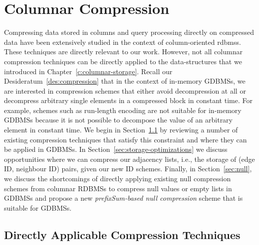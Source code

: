 \chapter{Columnar Compression}
\label{columnar-compression}

Compressing data stored in columns and query processing directly on compressed data have been extensively studied in the context of column-oriented \gls{rdbms}s. These techniques are directly relevant to our work. However, not all columnar compression techniques can be directly applied to the data-structures that we introduced in Chapter~\ref{c:columnar-storage}. Recall our Desideratum~\ref{des:compression} that in the context of in-memory GDBMSs, we are interested in compression schemes that either avoid decompression at all or decompress arbitrary single elements in a compressed block in constant time. For example, schemes such as run-length encoding are not suitable for in-memory GDBMSs because it is not possible to decompose the value of an arbitrary element in constant time. We begin in Section~\ref{sec:col-existing} by reviewing a number of existing compression techniques that satisfy this constraint and where they can be applied in GDBMSs. In Section~\ref{sec:storage-optimizations} we discuss opportunities where we can compress our adjacency lists, i.e., the storage of (edge ID, neighbour ID) pairs, given our new ID schemes. Finally, in Section~\ref{sec:null}, we discuss the shortcomings of directly applying existing null compression schemes from columnar RDBMSs to compress null values or empty lists in GDBMSs and propose a new \emph{prefixSum-based null compression} scheme that is suitable for GDBMSs.

\section{Directly Applicable Compression Techniques}
\label{sec:col-existing}

